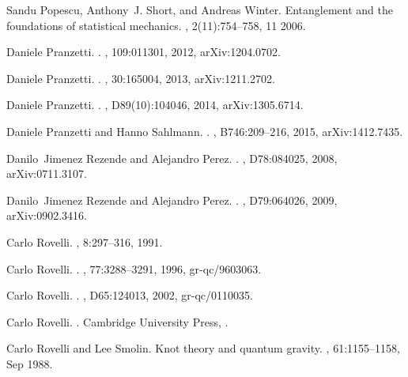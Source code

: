 \documentclass[aps, nofootinbib,superscriptaddress,12pt]{revtex4-2}
\begin{document}
\begin{thebibliography}{100}
Sandu Popescu, Anthony~J. Short, and Andreas Winter.
\newblock Entanglement and the foundations of statistical mechanics.
, 2(11):754--758, 11 2006.

Daniele Pranzetti.
.
, 109:011301, 2012, arXiv:1204.0702.

Daniele Pranzetti.
.
, 30:165004, 2013, arXiv:1211.2702.

Daniele Pranzetti.
.
, D89(10):104046, 2014, arXiv:1305.6714.

Daniele Pranzetti and Hanno Sahlmann.
.
, B746:209--216, 2015, arXiv:1412.7435.

Danilo~Jimenez Rezende and Alejandro Perez.
.
, D78:084025, 2008, arXiv:0711.3107.

Danilo~Jimenez Rezende and Alejandro Perez.
.
, D79:064026, 2009, arXiv:0902.3416.

Carlo Rovelli.
, 8:297--316, 1991.

Carlo Rovelli.
.
, 77:3288--3291, 1996, gr-qc/9603063.

Carlo Rovelli.
.
, D65:124013, 2002, gr-qc/0110035.

Carlo Rovelli.
.
\newblock Cambridge University Press,
.

Carlo Rovelli and Lee Smolin.
\newblock Knot theory and quantum gravity.
, 61:1155--1158, Sep 1988.


\end{thebibliography}
\end{document}
